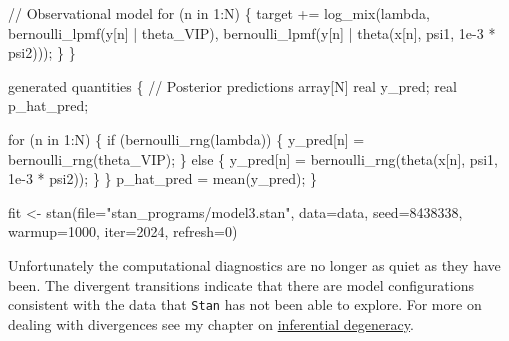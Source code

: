 \documentclass[
  letterpaper,
  DIV=11,
  numbers=noendperiod]{scrartcl}
\newenvironment{Shaded}{\begin{snugshade}}{\end{snugshade}}
\newcommand{\AttributeTok}[1]{\textcolor[rgb]{0.40,0.45,0.13}{#1}}
\newcommand{\CommentTok}[1]{\textcolor[rgb]{0.37,0.37,0.37}{#1}}
\newcommand{\ControlFlowTok}[1]{\textcolor[rgb]{0.00,0.23,0.31}{#1}}
\newcommand{\DataTypeTok}[1]{\textcolor[rgb]{0.68,0.00,0.00}{#1}}
\newcommand{\DecValTok}[1]{\textcolor[rgb]{0.68,0.00,0.00}{#1}}
\newcommand{\FloatTok}[1]{\textcolor[rgb]{0.68,0.00,0.00}{#1}}
\newcommand{\FunctionTok}[1]{\textcolor[rgb]{0.28,0.35,0.67}{#1}}
\newcommand{\KeywordTok}[1]{\textcolor[rgb]{0.00,0.23,0.31}{#1}}
\newcommand{\NormalTok}[1]{\textcolor[rgb]{0.00,0.23,0.31}{#1}}
\newcommand{\OtherTok}[1]{\textcolor[rgb]{0.00,0.23,0.31}{#1}}
\newcommand{\SpecialCharTok}[1]{\textcolor[rgb]{0.37,0.37,0.37}{#1}}
\newcommand{\StringTok}[1]{\textcolor[rgb]{0.13,0.47,0.30}{#1}}
\begin{document}
\begin{codelisting}
\begin{Shaded}
\begin{Highlighting}[]
  \CommentTok{// Observational model}
  \ControlFlowTok{for}\NormalTok{ (n }\ControlFlowTok{in} \DecValTok{1}\NormalTok{:N) \{}
    \KeywordTok{target +=}\NormalTok{ log\_mix(lambda,}
\NormalTok{                      bernoulli\_lpmf(y[n] | theta\_VIP),}
\NormalTok{                      bernoulli\_lpmf(y[n] | theta(x[n], psi1, }\FloatTok{1e{-}3}\NormalTok{ * psi2)));}
\NormalTok{  \}}
\NormalTok{\}}

\KeywordTok{generated quantities}\NormalTok{ \{}
  \CommentTok{// Posterior predictions}
  \DataTypeTok{array}\NormalTok{[N] }\DataTypeTok{real}\NormalTok{ y\_pred;}
  \DataTypeTok{real}\NormalTok{ p\_hat\_pred;}

  \ControlFlowTok{for}\NormalTok{ (n }\ControlFlowTok{in} \DecValTok{1}\NormalTok{:N) \{}
    \ControlFlowTok{if}\NormalTok{ (bernoulli\_rng(lambda)) \{}
\NormalTok{      y\_pred[n] = bernoulli\_rng(theta\_VIP);}
\NormalTok{    \} }\ControlFlowTok{else}\NormalTok{ \{}
\NormalTok{      y\_pred[n] = bernoulli\_rng(theta(x[n], psi1, }\FloatTok{1e{-}3}\NormalTok{ * psi2));}
\NormalTok{    \}}
\NormalTok{  \}}
\NormalTok{  p\_hat\_pred = mean(y\_pred);}
\NormalTok{\}}
\end{Highlighting}
\end{Shaded}

\end{codelisting}

\begin{Shaded}
\begin{Highlighting}[]
\NormalTok{fit }\OtherTok{\textless{}{-}} \FunctionTok{stan}\NormalTok{(}\AttributeTok{file=}\StringTok{"stan\_programs/model3.stan"}\NormalTok{,}
            \AttributeTok{data=}\NormalTok{data, }\AttributeTok{seed=}\DecValTok{8438338}\NormalTok{,}
            \AttributeTok{warmup=}\DecValTok{1000}\NormalTok{, }\AttributeTok{iter=}\DecValTok{2024}\NormalTok{, }\AttributeTok{refresh=}\DecValTok{0}\NormalTok{)}
\end{Highlighting}
\end{Shaded}

Unfortunately the computational diagnostics are no longer as quiet as
they have been. The divergent transitions indicate that there are model
configurations consistent with the data that \texttt{Stan} has not been
able to explore. For more on dealing with divergences see my chapter on
\href{https://betanalpha.github.io/assets/case_studies/identifiability.html}{inferential
degeneracy}.

\begin{Shaded}
\end{Shaded}
\end{document}
